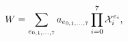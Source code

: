 \begin{equation}
\label{eq:Wanst}
W=\sum_{e_{0,1,...,7}}a_{e_{0,1,...,7}}\prod_{i=0}^7{\cal X}^{e_i}_i,
\end{equation}

